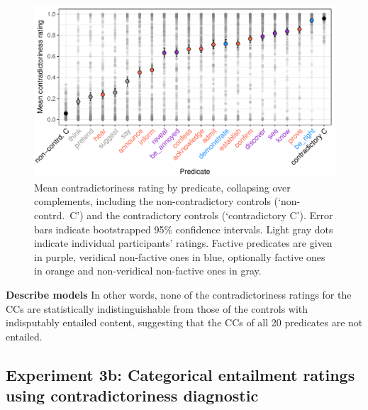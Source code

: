 \documentclass[11pt,fleqn]{article}
\newcommand{\6}{\mbox{$[\hspace*{-.6mm}[$}}
\newcommand{\9}{\mbox{$]\hspace*{-.6mm}]$}}
\begin{document}
{%

\begin{figure}[h!]
\centering

\includegraphics[width=.7\paperwidth]{../../results/2-veridicality2/graphs/means-contradictoriness-by-predicate-variability}

\caption{Mean contradictoriness rating by predicate, collapsing over complements, including the non-contradictory controls (`non-contrd.\ C') and the contradictory controls (`contradictory C'). Error bars indicate bootstrapped 95\% confidence intervals. Light gray dots indicate individual participants' ratings. Factive predicates are given in purple, veridical non-factive ones in blue, optionally factive ones in orange and non-veridical non-factive ones in gray.}
\label{f-veridicality-predicate2}
\end{figure}

{\bf Describe models} In other words, none of the contradictoriness ratings for the CCs are statistically indistinguishable from those of the controls with indisputably entailed content, suggesting that the CCs of all 20 predicates are not entailed.

\subsection{Experiment 3b: Categorical entailment ratings using contradictoriness diagnostic}
\label{s32}

}
\end{document}
